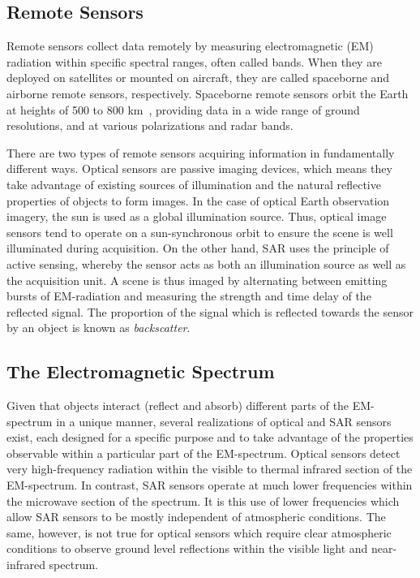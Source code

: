 \subsection{Remote Sensors}
Remote sensors collect data remotely by measuring electromagnetic (EM) radiation within specific spectral ranges,  often called bands. 
When they are deployed on satellites or mounted on aircraft, they are called spaceborne and airborne remote sensors, respectively.
 Spaceborne remote sensors orbit the Earth at heights of 500 to 800 km~\citep{everaerts2005pegasus}, providing data in a wide range of ground resolutions, and at various polarizations and radar bands. 

There are two types of remote sensors acquiring information in fundamentally different ways.
Optical sensors are passive imaging devices, which means they take advantage of existing sources of illumination and the natural reflective properties of objects to form
images. 
In the case of optical Earth observation imagery, the sun is used as a global illumination source. 
Thus, optical image sensors tend to operate on a sun-synchronous orbit to ensure the scene is well illuminated during acquisition. 
On the other hand, SAR uses the principle of active sensing, whereby the sensor acts as both an illumination source as well as the acquisition unit. 
A scene is thus imaged by alternating between emitting bursts of EM-radiation and measuring the strength and time delay of the reflected signal. 
The proportion of the signal which is reflected towards the sensor by an object is known as \textit{backscatter}.
\subsection{The Electromagnetic Spectrum}
Given that objects interact (reflect and absorb) different parts of the EM-spectrum in a unique manner, several realizations of optical and SAR sensors exist, each designed for
a specific purpose and to take advantage of the properties observable within a particular part of the EM-spectrum.
Optical sensors detect very high-frequency radiation within the visible to thermal infrared section of the EM-spectrum.
In contrast, SAR sensors operate at much lower frequencies within the microwave section of the spectrum.
It is this use of lower frequencies which allow SAR sensors to be mostly independent of atmospheric conditions.
The same, however, is not true for optical sensors which require clear atmospheric conditions to observe ground level reflections within the visible light and near-infrared spectrum.

